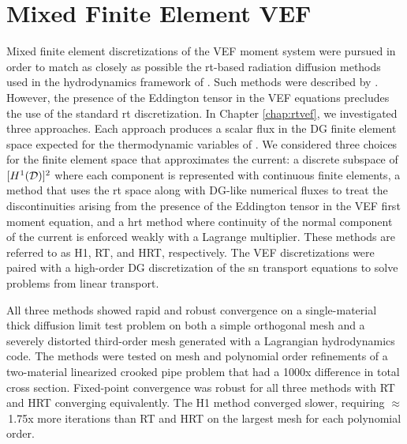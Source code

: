 \documentclass[../doc.tex]{subfiles}
\begin{document}
\section{Mixed Finite Element VEF}
Mixed finite element discretizations of the VEF moment system were pursued in order to match as closely as possible the \gls{rt}-based radiation diffusion methods used in the hydrodynamics framework of \cite{blast}. Such methods were described by \textcite{pete}. However, the presence of the Eddington tensor in the VEF equations precludes the use of the standard \gls{rt} discretization. In Chapter \ref{chap:rtvef}, we investigated three approaches. Each approach produces a scalar flux in the DG finite element space expected for the thermodynamic variables of \cite{blast}. We considered three choices for the finite element space that approximates the current: a discrete subspace of $[H^1(\mathcal{D})]^2$ where each component is represented with continuous finite elements, a method that uses the \gls{rt} space along with DG-like numerical fluxes to treat the discontinuities arising from the presence of the Eddington tensor in the VEF first moment equation, and a \gls{hrt} method where continuity of the normal component of the current is enforced weakly with a Lagrange multiplier. These methods are referred to as H1, RT, and HRT, respectively. The VEF discretizations were paired with a high-order DG discretization of the \gls{sn} transport equations to solve problems from linear transport. 

All three methods showed rapid and robust convergence on a single-material thick diffusion limit test problem on both a simple orthogonal mesh and a severely distorted third-order mesh generated with a Lagrangian hydrodynamics code. The methods were tested on mesh and polynomial order refinements of a two-material linearized crooked pipe problem that had a 1000x difference in total cross section. Fixed-point convergence was robust for all three methods with RT and HRT converging equivalently. The H1 method converged slower, requiring $\approx$\!\,1.75x more iterations than RT and HRT on the largest mesh for each polynomial order. 
\end{document}
